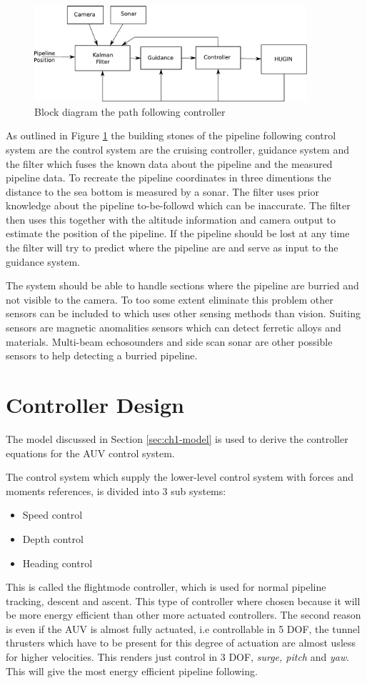 	\begin{figure}[hbtp]
		\centering
		\includegraphics[width=0.9\textwidth]{pics/blockdiagram}
		\caption{Block diagram the path following controller}
		\label{fig:ch2-blockdiagram}
	\end{figure}
	As outlined in Figure \ref{fig:ch2-blockdiagram} the building stones of the  pipeline following
	control system are the control system are the cruising controller, guidance system and the filter
	which fuses the known data about the pipeline and the measured pipeline data. To recreate the 
	pipeline coordinates in three dimentions the distance to the sea bottom is measured by a sonar. The
	filter uses prior knowledge about the pipeline to-be-followd which can be inaccurate. The filter then
	uses this together with the altitude information and camera output to estimate the position of the
	pipeline. If the pipeline should be lost at any time the filter will try to predict where the pipeline
	are and serve as input to the guidance system.

	The system should be able to handle sections where the pipeline are burried and not visible to the
	camera. To too some extent eliminate this problem other sensors can be included to which uses other
	sensing methods than vision. Suiting sensors are magnetic anomalities sensors which can detect
	ferretic alloys and materials. Multi-beam echosounders and side scan sonar are other possible sensors
	to help detecting a burried pipeline.

\section{Controller Design}
	The model discussed in Section \ref{sec:ch1-model} is used to derive the controller equations for the
	AUV control system.

	The control system which supply the lower-level control system with forces and moments references, is 
	divided into 3 sub systems:
		\begin{itemize}
			\item Speed control
			\item Depth control
			\item Heading control
		\end{itemize}
	This is called the flightmode controller, which is used for normal pipeline tracking, descent and
	ascent. This type of controller where chosen because it will be more energy efficient than other more
	actuated controllers. The second reason is even if the AUV is almost fully actuated, i.e
	controllable in 5 DOF, the tunnel thrusters which have to be present for this degree of actuation are almost
	usless for higher velocities. This renders just control in 3 DOF, \textit{surge, pitch} and
	\textit{yaw}. This will give the most energy efficient pipeline following. 
	
